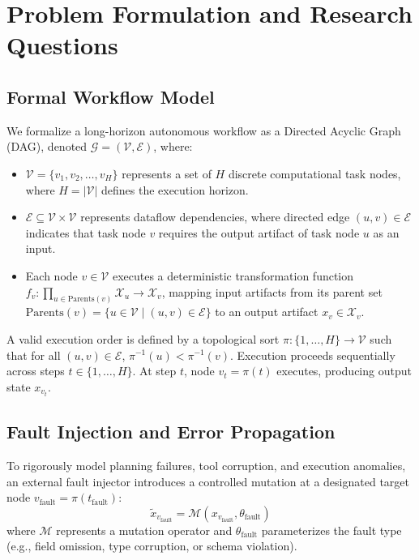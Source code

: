 \section{Problem Formulation and Research Questions}
\label{sec:problem_formulation}

\subsection{Formal Workflow Model}
We formalize a long-horizon autonomous workflow as a Directed Acyclic Graph (DAG), denoted $\mathcal{G} = (\mathcal{V}, \mathcal{E})$, where:
\begin{itemize}
    \item $\mathcal{V} = \{v_1, v_2, \dots, v_H\}$ represents a set of $H$ discrete computational task nodes, where $H = |\mathcal{V}|$ defines the execution horizon.
    \item $\mathcal{E} \subseteq \mathcal{V} \times \mathcal{V}$ represents dataflow dependencies, where directed edge $(u, v) \in \mathcal{E}$ indicates that task node $v$ requires the output artifact of task node $u$ as an input.
    \item Each node $v \in \mathcal{V}$ executes a deterministic transformation function $f_v: \prod_{u \in \text{Parents}(v)} \mathcal{X}_u \to \mathcal{X}_v$, mapping input artifacts from its parent set $\text{Parents}(v) = \{u \in \mathcal{V} \mid (u, v) \in \mathcal{E}\}$ to an output artifact $x_v \in \mathcal{X}_v$.
\end{itemize}

A valid execution order is defined by a topological sort $\pi: \{1, \dots, H\} \to \mathcal{V}$ such that for all $(u, v) \in \mathcal{E}$, $\pi^{-1}(u) < \pi^{-1}(v)$. Execution proceeds sequentially across steps $t \in \{1, \dots, H\}$. At step $t$, node $v_t = \pi(t)$ executes, producing output state $x_{v_t}$.

\subsection{Fault Injection and Error Propagation}
To rigorously model planning failures, tool corruption, and execution anomalies, an external fault injector introduces a controlled mutation at a designated target node $v_{\text{fault}} = \pi(t_{\text{fault}})$:
\begin{equation}
    \tilde{x}_{v_{\text{fault}}} = \mathcal{M}(x_{v_{\text{fault}}}, \theta_{\text{fault}})
\end{equation}
where $\mathcal{M}$ represents a mutation operator and $\theta_{\text{fault}}$ parameterizes the fault type (e.g., field omission, type corruption, or schema violation).

